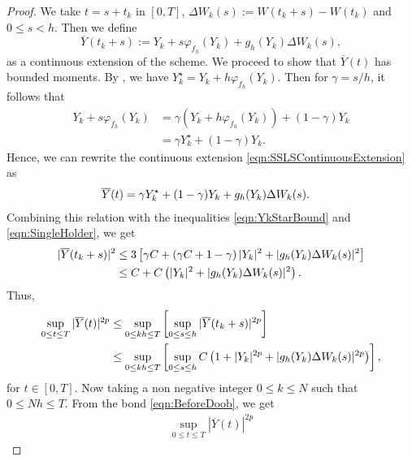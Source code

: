 	\begin{proof}
		We take $t=s+t_k$ in $ [0,T]$, $\Delta W_k(s):= W(t_k+s)- W(t_k)$ and $0\leq s <h$.
		Then we define 
		\begin{equation}\label{eqn:SSLSContinuousExtension}
			\overline{Y}(t_k+s):= Y_k + s \varphi_{f_h}(Y_k) + g_h(Y_k)\Delta W_k(s),
		\end{equation}
		as a continuous extension of the \SM scheme. We proceed to show that $\overline{Y}(t)$ has bounded moments.
		By , we have $Y_k^{\star}= Y_k + h \varphi_{f_h}(Y_k)$. 
		Then for $\gamma = s/h$, it follows that
		\begin{align*}
			Y_k + s \varphi_{f_h}(Y_k)
			&= 
			\gamma (Y_k + h \varphi_{f_h}(Y_k)) +(1-\gamma)Y_k\\
			&=
			\gamma Y_k^{\star} + (1-\gamma)Y_k.
		\end{align*}
		Hence, we can rewrite the continuous extension \eqref{eqn:SSLSContinuousExtension} as
		\begin{align}
			\overline{Y}(t) &=
			\gamma Y^{\star}_k + (1-\gamma) Y_k +g_h(Y_k) \Delta W_k(s). %
			\notag
		\end{align}
		Combining this relation with  the inequalities \eqref{eqn:YkStarBound} and \eqref{eqn:SingleHolder}, we get
		\begin{align}
			|\overline{Y}(t_k+s) |^2 
			&\leq
				3\left[
					\gamma C
					+
					\left(
						\gamma C +1 - \gamma
					\right)
					|Y_k|^2
					+
					|g_h(Y_k)\Delta W_k(s)|^2
			\right] \notag\\
		&\leq
			C
			+
			C
			\left(
				|Y_k|^2 + |g_h(Y_k)\Delta W_k(s)|^2
			\right).
		\notag
		\end{align}
	Thus, 
	\begin{align}
		\sup_{0\leq t\leq T} |\overline{Y}(t)|^{2p}
		&\leq
			\sup_{0\leq kh\leq T}
			\left[
				\sup_{0\leq s\leq h}
					|\overline{Y}(t_k+s)|^{2p} 
			\right] 
		\notag\\
		&\leq
			\sup_{0\leq kh\leq T} 
			\left[
				\sup_{0\leq s\leq h}
					C 
					\left(
						1 + |Y_k|^{2p} + |g_h(Y_k)\Delta W_k(s)|^{2p}
					\right)
			\right],
		\label{eqn:BeforeDoob}
	\end{align}
	for $t\in [0,T]$.
	Now taking a non negative integer $0 \leq k \leq N$ such that $0\leq Nh \leq T$. From the bond 
	\eqref{eqn:BeforeDoob}, we get
	\begin{align}
		\sup_{0\leq t\leq T} |\overline{Y}(t)|^{2p}

\end{align}
\end{proof}
